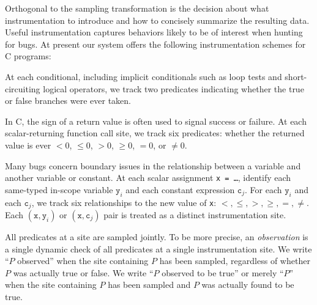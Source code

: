 \documentclass[draft]{sig-alternate}
\newcommand{\termdef}[1]{\emph{#1}}
\begin{document}
Orthogonal to the sampling transformation is the decision about what
instrumentation to introduce and how to concisely summarize the
resulting data.  Useful instrumentation captures behaviors likely to
be of interest when hunting for bugs.  At present our system offers
the following instrumentation schemes for C programs:

\begin{description}
\sloppy
\item[branches:] At each conditional, including implicit conditionals
such as loop tests and short-circuiting logical operators, we track two predicates
indicating whether the true or false branches were ever taken.

\item[returns:] In C, the
  sign of a return value is often used to signal success or failure.
  At each scalar-returning function call site, we track six predicates:
  whether the returned value is ever $< 0$, $\leq 0$, $> 0$, $\geq 0$,
  $= 0$, or $\neq 0$.

\item[scalar-pairs:] Many bugs
  concern boundary issues in the relationship between a
  variable and another variable or constant.  At
  each scalar assignment \texttt{x = \dots}, identify each
  same-typed in-scope variable $\mathtt{y}_i$ and each
  constant expression $\mathtt{c}_j$.  For each   $\mathtt{y}_i$ and each $\mathtt{c}_j$,
  we track six relationships to the new value of \texttt{x}: $<, \leq, >, \geq, =, \neq$.
  Each $(\mathtt{x}, \mathtt{y}_i)$ or $(\mathtt{x}, \mathtt{c}_j)$ pair
  is treated as a distinct instrumentation site.
\end{description}

All predicates at a site are sampled jointly.  To be more precise, an
\termdef{observation} is a single dynamic check of all predicates at a
single instrumentation site.  We write ``$P$ observed'' when the site
containing $P$ has been sampled, regardless of whether $P$ was
actually true or false.  We write ``$P$ observed to be true'' or
merely ``$P$'' when the site containing $P$ has been sampled and $P$
was actually found to be true.
\end{document}
